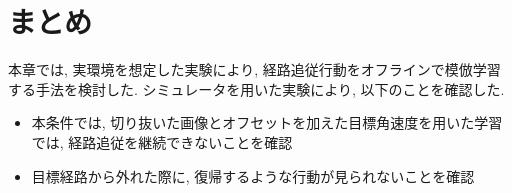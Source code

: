 \newpage
\section{まとめ}
本章では, 実環境を想定した実験により, 経路追従行動をオフラインで模倣学習する手法を検討した. シミュレータを用いた実験により, 以下のことを確認した. 

\begin{itemize}
  \item 本条件では, 切り抜いた画像とオフセットを加えた目標角速度を用いた学習では, 経路追従を継続できないことを確認
  \item 目標経路から外れた際に, 復帰するような行動が見られないことを確認
\end{itemize}



